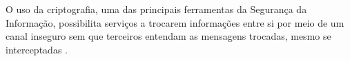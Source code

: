 \documentclass[12pt]{article}
\begin{document}
    
    
    
    
        O uso da criptografia, uma das principais ferramentas da Segurança da Informação, possibilita serviços a trocarem informações entre si por meio de um canal inseguro sem que terceiros entendam as mensagens trocadas, mesmo se interceptadas \cite{stinson2006cryptography}.
    
\end{document}
